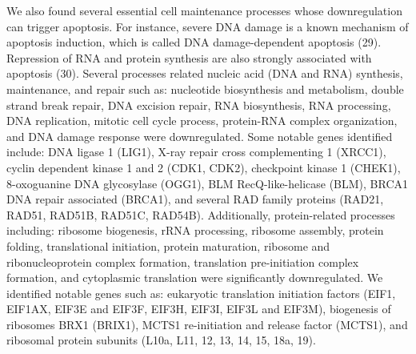 \documentclass[
]{article}
\begin{document}
We also found several essential cell maintenance processes whose
downregulation can trigger apoptosis. For instance, severe DNA damage is
a known mechanism of apoptosis induction, which is called DNA
damage-dependent apoptosis (29). Repression of RNA and protein synthesis
are also strongly associated with apoptosis (30). Several processes
related nucleic acid (DNA and RNA) synthesis, maintenance, and repair
such as: nucleotide biosynthesis and metabolism, double strand break
repair, DNA excision repair, RNA biosynthesis, RNA processing, DNA
replication, mitotic cell cycle process, protein-RNA complex
organization, and DNA damage response were downregulated. Some notable
genes identified include: DNA ligase 1 (LIG1), X-ray repair cross
complementing 1 (XRCC1), cyclin dependent kinase 1 and 2 (CDK1, CDK2),
checkpoint kinase 1 (CHEK1), 8-oxoguanine DNA glycosylase (OGG1), BLM
RecQ-like-helicase (BLM), BRCA1 DNA repair associated (BRCA1), and
several RAD family proteins (RAD21, RAD51, RAD51B, RAD51C, RAD54B).
Additionally, protein-related processes including: ribosome biogenesis,
rRNA processing, ribosome assembly, protein folding, translational
initiation, protein maturation, ribosome and ribonucleoprotein complex
formation, translation pre-initiation complex formation, and cytoplasmic
translation were significantly downregulated. We identified notable
genes such as: eukaryotic translation initiation factors (EIF1, EIF1AX,
EIF3E and EIF3F, EIF3H, EIF3I, EIF3L and EIF3M), biogenesis of ribosomes
BRX1 (BRIX1), MCTS1 re-initiation and release factor (MCTS1), and
ribosomal protein subunits (L10a, L11, 12, 13, 14, 15, 18a, 19).
\end{document}
